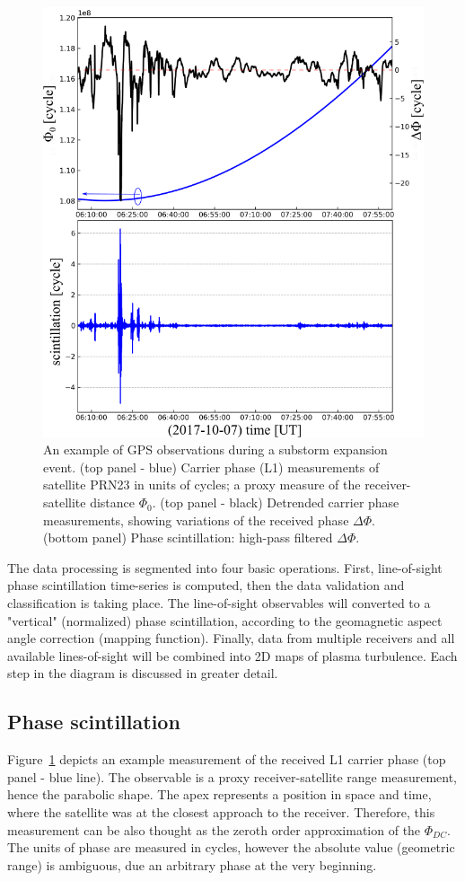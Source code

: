 \documentclass[letterpaper,12pt]{article}
\begin{document}
\begin{figure} %
\vspace{-1em}
\centering
\includegraphics[width=.48\columnwidth]{fig/range-phase-scint}
\caption{An example of GPS observations during a substorm expansion event. (top panel - blue) Carrier phase (L1) measurements of satellite PRN23 in units of cycles; a proxy measure of the receiver-satellite distance $\Phi_0$. (top panel - black) Detrended carrier phase measurements, showing variations of the received phase $\Delta\Phi$. (bottom panel) Phase scintillation: high-pass filtered $\Delta\Phi$.}
\label{fig:phase-scint}
\end{figure}
The data processing is segmented into four basic operations. First, line-of-sight phase scintillation time-series is computed, then the data validation and classification is taking place. The line-of-sight observables will converted to a "vertical" (normalized) phase scintillation, according to the geomagnetic aspect angle correction (mapping function). Finally, data from multiple receivers and all available lines-of-sight will be combined into 2D maps of plasma turbulence. Each step in the diagram is discussed in greater detail.

\vspace{-1em}\subsection{Phase scintillation}

Figure~\ref{fig:phase-scint} depicts an example measurement of the received L1 carrier phase (top panel - blue line). The observable is a proxy receiver-satellite range measurement, hence the parabolic shape. The apex represents a position in space and time, where the satellite was at the closest approach to the receiver. Therefore, this measurement can be also thought as the zeroth order approximation of the $\Phi_{DC}$. The units of phase are measured in cycles, however the absolute value (geometric range) is ambiguous, due an arbitrary phase at the very beginning. 
\end{document}
